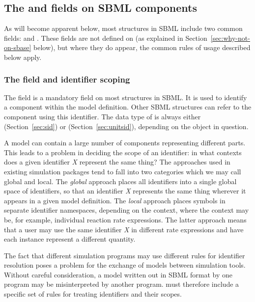 \subsection{The  and  fields on SBML components}
\label{sec:idnameattribs}

As will become apparent below, most structures in SBML include two
common fields:  and .  These fields are not
defined on \SBase (as explained in
Section~\ref{sec:why-not-on-sbase} below), but where they do
appear, the common rules of usage described below apply.


\subsubsection{The  field and identifier scoping}
\label{sec:identifiers}

The  field is a mandatory field on most structures in
SBML.  It is used to identify a component within the model
definition.  Other SBML structures can refer to the component
using this identifier.  The data type of  is always
either  (Section~\ref{sec:sid}) or
 (Section~\ref{sec:unitsid}), depending on the
object in question.

A model can contain a large number of components representing
different parts.  This leads to a problem in deciding the scope of
an identifier: in what contexts does a given identifier \emph{X}
represent the same thing?  The approaches used in existing
simulation packages tend to fall into two categories which we may
call global and local.  The \emph{global} approach places all
identifiers into a single global space of identifiers, so that an
identifier \emph{X} represents the same thing wherever it appears
in a given model definition.  The \emph{local} approach places
symbols in separate identifier namespaces, depending on the
context, where the context may be, for example, individual
reaction rate expressions.  The latter approach means that a user
may use the same identifier \emph{X} in different rate expressions
and have each instance represent a different quantity.

The fact that different simulation programs may use different
rules for identifier resolution poses a problem for the exchange
of models between simulation tools.  Without careful
consideration, a model written out in SBML format by one program
may be misinterpreted by another program.  \sbmltwo must therefore
include a specific set of rules for treating identifiers and their
scopes.

